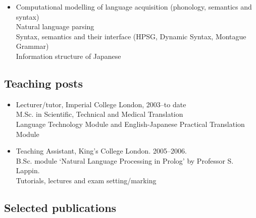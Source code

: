 \documentclass[a4paper]{article}
\begin{document}
\begin{itemize}
\item Computational modelling of language acquisition
  (phonology, semantics and syntax)\\ Natural
  language parsing\\ Syntax, semantics and their interface (HPSG,
  Dynamic Syntax, Montague Grammar)\\Information structure of Japanese

\end{itemize}

\vspace{-4mm}

\subsection*{Teaching posts}

\begin{itemize}

\item Lecturer/tutor, Imperial College London,  2003--to date\\
   M.Sc. in Scientific, Technical and Medical Translation \\
   Language Technology Module and English-Japanese Practical Translation Module

\item Teaching Assistant, King's College London. 2005--2006.\\
    B.Sc. module `Natural Language Processing in Prolog' by Professor S. Lappin.\\
   Tutorials, lectures and exam setting/marking

\vspace{-4mm}



\end{itemize}

\vspace{-3mm}
\subsection*{Selected publications}

\papersshort{}
\end{document}
